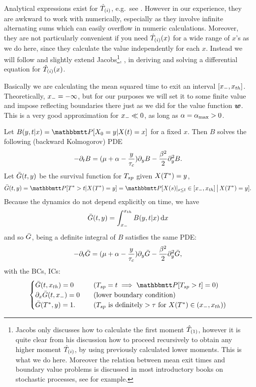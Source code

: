 Analytical expressions exist for ${ \hat{T}_{(i)} }$, e.g.\ see \cite{Inoue1995}.
However in our experience, they are awkward to work with numerically, especially
as they involve infinite alternating sums which can easily overflow in numeric
calculations. Moreover, they are not particularly convenient if you need ${ \hat{T}_{(i)} }
(x)$ for a wide range of $x$'s as we do here, since they calculate the value
independently for each $x$. Instead we will follow and slightly extend Jacobs\footnote{Jacobs only discusses how to calculate the first moment
${ \hat{T}_{(1)} }$, however it is quite clear from his discussion how to proceed
recursively to obtain any higher moment ${ \hat{T}_{(i)} }$, by using previously calculated
lower moments. This is what we do here. Moreover the relation between mean exit
times and boundary value problems is discussed in most
introductory books on stochastic processes, see \cite{Oksendal2007} for
example.}, \cite{Jacobs}, in deriving and solving a differential equation for
${ \hat{T}_{(i)} }(x)$.

Basically we are calculating the mean squared time to exit an interval $[{ x_{-} },
{ x_{th} }]$. Theoretically, ${ x_{-} } = -\infty$, but for our purposes we will set it to
some finite value and impose reflecting boundaries there just as we did for the
value function ${ \boldsymbol{w} }$. This is a very good approximation for ${ x_{-} } \ll 0$, as
long as $\alpha = { \alpha_{\textrm{max}} } >0$.

Let $B(y,t|x) = \Prob[X_0 = y| X(t) = x]$ for a fixed $x$. Then $B$ solves the
following (backward Kolmogorov) PDE
\begin{equation}
-{\partial}_t B = ({\mu } + \alpha - \frac y{\tau_c}){\partial}_yB - \frac {\beta^2} 2 {\partial}_y^2 B.
\label{eq:backward_Xdensity}
\end{equation}
Let ${ \bar{G} }(t,y)$ be the survival function for $T_{sp}$ given $X({ T^* }) = y$,
$$\G(t,y) = \Prob[\T>t | X(\T) = y] = \Prob[X(s)|_{s \leq t} \in [\xmin,
\xth] \,\big|\, X(\T) = y].$$
Because the dynamics do not depend explicitly on time, we have
$$
{ \bar{G} }(t,y) = \int_{ x_{-} }^{ x_{th} } B(y,t|x) \, \mathrm{d} x
$$
and so ${ \bar{G} }$, being a definite integral of $B$ satisfies the same PDE:
\begin{equation}
-{\partial}_t { \bar{G} } = ({\mu } + \alpha - \frac y{\tau_c}) {\partial}_y{ \bar{G} } - \frac {\beta^2} 2 {\partial}_y^2 { \bar{G} },
\label{eq:backward_SDF}
\end{equation}
with the BCs, ICs:
\begin{equation}
\begin{cases}
\G(t,\xth) = 0 & \quad (\ts = t \implies \Prob[\ts>t] = 0)
\\
\di_x \G(t,\xmin) = 0  & \quad (\textrm{lower boundary condition})
\\
\G(\T, y) = 1. & \quad (\ts \textrm{ is definitely} > \t \textrm{ for } X(\T)
\in (\xmin, \xth) )
\end{cases}
\end{equation}

